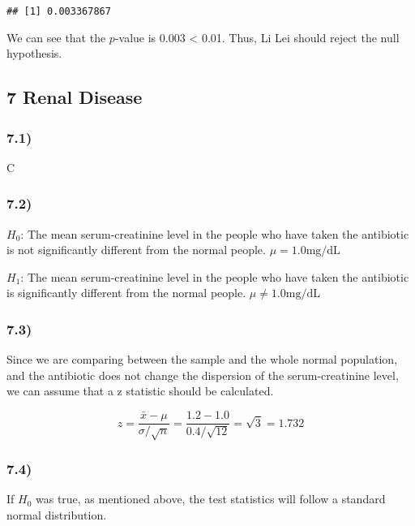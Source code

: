 \documentclass[
]{article}
\begin{document}
\begin{verbatim}
## [1] 0.003367867
\end{verbatim}

We can see that the \(p\)-value is 0.003 \textless{} 0.01. Thus, Li Lei
should reject the null hypothesis.

\hypertarget{renal-disease}{%
\subsection{7 Renal Disease}\label{renal-disease}}

\hypertarget{section-12}{%
\subsubsection{7.1)}\label{section-12}}

C

\hypertarget{section-13}{%
\subsubsection{7.2)}\label{section-13}}

\(H_0\): The mean serum-creatinine level in the people who have taken
the antibiotic is not significantly different from the normal people.
\(\mu = 1.0 \text{mg/dL}\)

\(H_1\): The mean serum-creatinine level in the people who have taken
the antibiotic is significantly different from the normal people.
\(\mu \not= 1.0 \text{mg/dL}\)

\hypertarget{section-14}{%
\subsubsection{7.3)}\label{section-14}}

Since we are comparing between the sample and the whole normal
population, and the antibiotic does not change the dispersion of the
serum-creatinine level, we can assume that a z statistic should be
calculated.

\[
z = \frac{\bar x - \mu}{\sigma/ \sqrt{n}} = \frac{1.2 - 1.0}{0.4 / \sqrt{12}} = \sqrt{3} = 1.732
\]

\hypertarget{section-15}{%
\subsubsection{7.4)}\label{section-15}}

If \(H_0\) was true, as mentioned above, the test statistics will follow
a standard normal distribution.
\end{document}
